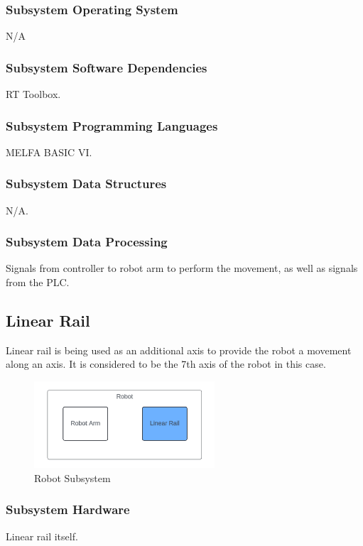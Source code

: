 \subsubsection{Subsystem Operating System}
N/A

\subsubsection{Subsystem Software Dependencies}
RT Toolbox.

\subsubsection{Subsystem Programming Languages}
MELFA BASIC VI.

\subsubsection{Subsystem Data Structures}
N/A.

\subsubsection{Subsystem Data Processing}
Signals from controller to robot arm to perform the movement, as well as signals from the PLC.

\subsection{Linear Rail}
Linear rail is being used as an additional axis to provide the robot a movement along an axis. It is considered to be the 7th axis of the robot in this case.

\begin{figure}[h!]
	\centering
 	\includegraphics[width=0.60\textwidth]{images/linear_rail_output.png}
 \caption{Robot Subsystem}
\end{figure}

\subsubsection{Subsystem Hardware}
Linear rail itself.

